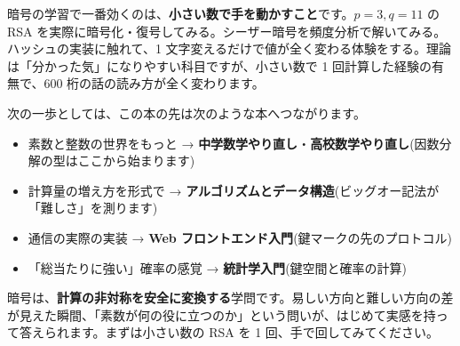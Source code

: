 \documentclass{article}
\begin{document}
暗号の学習で一番効くのは、\textbf{小さい数で手を動かすこと}です。\( p=3, q=11 \) の RSA を実際に暗号化・復号してみる。シーザー暗号を頻度分析で解いてみる。ハッシュの実装に触れて、1 文字変えるだけで値が全く変わる体験をする。理論は「分かった気」になりやすい科目ですが、小さい数で 1 回計算した経験の有無で、600 桁の話の読み方が全く変わります。

次の一歩としては、この本の先は次のような本へつながります。

\begin{itemize}
\item 素数と整数の世界をもっと → \textbf{中学数学やり直し}・\textbf{高校数学やり直し}(因数分解の型はここから始まります)
\item 計算量の増え方を形式で → \textbf{アルゴリズムとデータ構造}(ビッグオー記法が「難しさ」を測ります)
\item 通信の実際の実装 → \textbf{Web フロントエンド入門}(鍵マークの先のプロトコル)
\item 「総当たりに強い」確率の感覚 → \textbf{統計学入門}(鍵空間と確率の計算)
\end{itemize}

暗号は、\textbf{計算の非対称を安全に変換する}学問です。易しい方向と難しい方向の差が見えた瞬間、「素数が何の役に立つのか」という問いが、はじめて実感を持って答えられます。まずは小さい数の RSA を 1 回、手で回してみてください。
\end{document}
